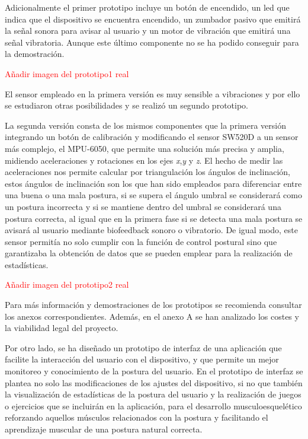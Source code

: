 Adicionalmente el primer prototipo incluye un botón de encendido, un led que indica que el dispositivo se encuentra encendido, un zumbador pasivo que emitirá la señal sonora para avisar al usuario y un motor de vibración que emitirá una señal vibratoria. Aunque este último componente no se ha podido conseguir para la demostración.

\textcolor{red}{Añadir imagen del prototipo1 real}

El sensor empleado en la primera versión es muy sensible a vibraciones y por ello se estudiaron otras posibilidades y se realizó un segundo prototipo.

La segunda versión consta de los mismos componentes que la primera versión integrando un botón de calibración y modificando el sensor SW520D\cite{SW520D_1} a un sensor más complejo, el MPU-6050\cite{MPU6050_1,MPU6050_2}, que permite una solución más precisa y amplia, midiendo aceleraciones y rotaciones en los ejes \textit{x},\textit{y} y \textit{z}. El hecho de medir las aceleraciones nos permite calcular por triangulación los ángulos de inclinación, estos ángulos de inclinación son los que han sido empleados para diferenciar entre una buena o una mala postura, si se supera el ángulo umbral se considerará como un postura incorrecta y si se mantiene dentro del umbral se considerará una postura correcta, al igual que en la primera fase si se detecta una mala postura se avisará al usuario mediante biofeedback sonoro o vibratorio. De igual modo, este sensor permitía no solo cumplir con la función de control postural sino que garantizaba la obtención de datos que se pueden emplear para la realización de estadísticas.

\textcolor{red}{Añadir imagen del prototipo2 real}

Para más información y demostraciones de los prototipos se recomienda consultar los anexos correspondientes. Además, en el anexo A se han analizado los costes y la viabilidad legal del proyecto.

Por otro lado, se ha diseñado un prototipo de interfaz de una aplicación que facilite la interacción del usuario con el dispositivo, y que permite un mejor monitoreo y conocimiento de la postura del usuario. En el prototipo de interfaz se plantea no solo las modificaciones de los ajustes del dispositivo, si no que también la visualización de estadísticas de la postura del usuario y la realización de juegos o ejercicios que se incluirán en la aplicación, para el desarrollo musculoesquelético reforzando aquellos músculos relacionados con la postura y facilitando el aprendizaje muscular de una postura natural correcta.

